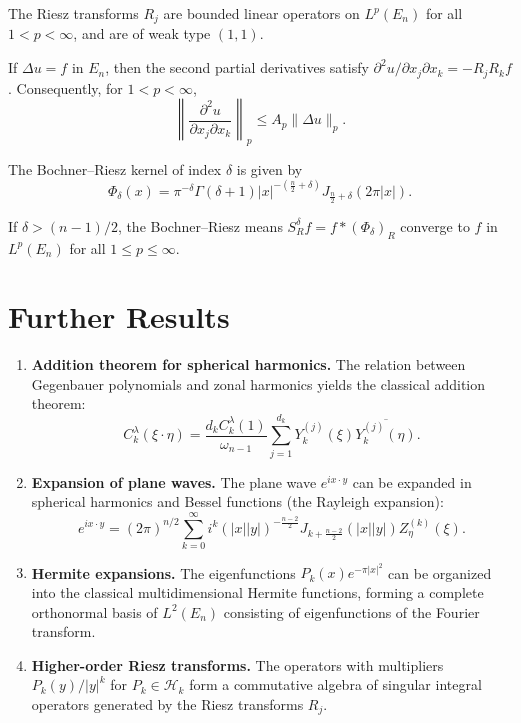 \begin{theorem}\label{thm:c4-4-11}
The Riesz transforms $R_j$ are bounded linear operators on $L^p(E_n)$ for all $1 < p < \infty$, and are of weak type $(1, 1)$.
\end{theorem}

\begin{corollary}\label{cor:c4-4-12}
If $\Delta u = f$ in $E_n$, then the second partial derivatives satisfy $\partial^2 u / \partial x_j \partial x_k = -R_j R_k f$. Consequently, for $1 < p < \infty$,
\[
\left\| \frac{\partial^2 u}{\partial x_j \partial x_k} \right\|_p \leq A_p \|\Delta u\|_p.
\]
\end{corollary}

\begin{lemma}\label{lem:c4-4-13}
The Bochner--Riesz kernel of index $\delta$ is given by
\begin{equation}\label{eq:c4-4-14}
\Phi_\delta(x) = \pi^{-\delta} \Gamma(\delta + 1) |x|^{-\left(\frac{n}{2} + \delta\right)} J_{\frac{n}{2} + \delta}(2\pi |x|).
\end{equation}
\end{lemma}

\begin{theorem}\label{thm:c4-4-15}
If $\delta > (n - 1)/2$, the Bochner--Riesz means $S_R^\delta f = f * (\Phi_\delta)_R$ converge to $f$ in $L^p(E_n)$ for all $1 \leq p \leq \infty$.
\end{theorem}

\section{Further Results}

\begin{enumerate}
\item[5.1.] \textbf{Addition theorem for spherical harmonics.} The relation between Gegenbauer polynomials and zonal harmonics yields the classical addition theorem:
\[
C_k^\lambda(\xi \cdot \eta) = \frac{d_k C_k^\lambda(1)}{\omega_{n-1}} \sum_{j=1}^{d_k} Y_k^{(j)}(\xi) \overline{Y_k^{(j)}(\eta)}.
\]

\item[5.2.] \textbf{Expansion of plane waves.} The plane wave $e^{i x \cdot y}$ can be expanded in spherical harmonics and Bessel functions (the Rayleigh expansion):
\[
e^{i x \cdot y} = (2\pi)^{n/2} \sum_{k=0}^\infty i^k (|x||y|)^{-\frac{n-2}{2}} J_{k + \frac{n-2}{2}}(|x||y|) Z_{\eta}^{(k)}(\xi).
\]

\item[5.3.] \textbf{Hermite expansions.} The eigenfunctions $P_k(x) e^{-\pi |x|^2}$ can be organized into the classical multidimensional Hermite functions, forming a complete orthonormal basis of $L^2(E_n)$ consisting of eigenfunctions of the Fourier transform.

\item[5.4.] \textbf{Higher-order Riesz transforms.} The operators with multipliers $P_k(y)/|y|^k$ for $P_k \in \mathcal{H}_k$ form a commutative algebra of singular integral operators generated by the Riesz transforms $R_j$.
\end{enumerate}

